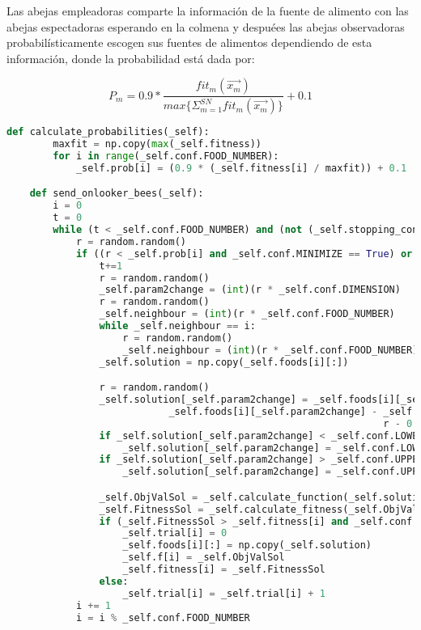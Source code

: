 \documentclass{article}
\begin{document}
Las  abejas  empleadoras  comparte  la  información  de  la  fuente  de alimento con las abejas espectadoras esperando en la colmena y despuées las abejas observadoras probabilísticamente escogen sus fuentes de alimentos dependiendo de esta información, donde la probabilidad está dada por:

\begin{equation}
  P_m= 0.9 * \frac{fit_m(\vec{x_m})}{max \{\Sigma_{m=1}^{SN}fit_m(\vec{x_m})\}}  + 0.1
\end{equation}

\begin{lstlisting}[language=Python]
    def calculate_probabilities(_self):
        maxfit = np.copy(max(_self.fitness))
        for i in range(_self.conf.FOOD_NUMBER):
            _self.prob[i] = (0.9 * (_self.fitness[i] / maxfit)) + 0.1

    def send_onlooker_bees(_self):
        i = 0
        t = 0
        while (t < _self.conf.FOOD_NUMBER) and (not (_self.stopping_condition())):
            r = random.random()
            if ((r < _self.prob[i] and _self.conf.MINIMIZE == True) or (r > _self.prob[i] and _self.conf.MINIMIZE == False)):
                t+=1
                r = random.random()
                _self.param2change = (int)(r * _self.conf.DIMENSION)
                r = random.random()
                _self.neighbour = (int)(r * _self.conf.FOOD_NUMBER)
                while _self.neighbour == i:
                    r = random.random()
                    _self.neighbour = (int)(r * _self.conf.FOOD_NUMBER)
                _self.solution = np.copy(_self.foods[i][:])

                r = random.random()
                _self.solution[_self.param2change] = _self.foods[i][_self.param2change] + (
                            _self.foods[i][_self.param2change] - _self.foods[_self.neighbour][_self.param2change]) * (
                                                                 r - 0.5) * 2
                if _self.solution[_self.param2change] < _self.conf.LOWER_BOUND:
                    _self.solution[_self.param2change] = _self.conf.LOWER_BOUND
                if _self.solution[_self.param2change] > _self.conf.UPPER_BOUND:
                    _self.solution[_self.param2change] = _self.conf.UPPER_BOUND

                _self.ObjValSol = _self.calculate_function(_self.solution)[0]
                _self.FitnessSol = _self.calculate_fitness(_self.ObjValSol)
                if (_self.FitnessSol > _self.fitness[i] and _self.conf.MINIMIZE == True) or (_self.FitnessSol <= _self.fitness[i] and _self.conf.MINIMIZE == False):
                    _self.trial[i] = 0
                    _self.foods[i][:] = np.copy(_self.solution)
                    _self.f[i] = _self.ObjValSol
                    _self.fitness[i] = _self.FitnessSol
                else:
                    _self.trial[i] = _self.trial[i] + 1
            i += 1
            i = i % _self.conf.FOOD_NUMBER
\end{lstlisting}
\end{document}
